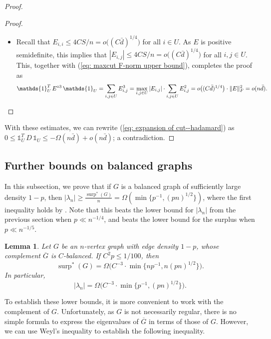 \documentclass[11pt]{article}
\theoremstyle{plain}
\newtheorem{lemma}[theorem]{Lemma}
\theoremstyle{definition}
\DeclareMathOperator{\surp}{surp}
\begin{document}
\begin{proof}
\begin{proof}
\begin{itemize}
        \item[(3)]  Recall that $E_{i,i} \le 4CS/n=o\big((C\bar{d})^{1/4}\big)$ for all $i \in U$. As $E$ is positive semidefinite, this implies that $|E_{i,j}|\leq 4CS/n =o\big((C\bar{d})^{1/4}\big)$ for all $i,j \in U$.
        This, together with (\ref{eq: maxcut F-norm upper bound}), completes the proof as 
        \[
            \mathds{1}_U^T\,E^{\circ 3}\,\mathds{1}_U
            = \sum_{i,j \in U} E_{i,j}^3
            = \max_{i,j\in U} |E_{i,j}|\cdot \sum_{i,j \in U} E_{i,j}^2
            = o\big((C\bar{d})^{1/4}\big)\cdot \|E\|_F^2
            = o(n\bar{d}).
            \hfill\qedhere
        \]
        \end{itemize}
    \end{proof}

     With these estimates, we can rewrite  (\ref{eq: expansion of cut--hadamard}) as $0 \le \mathds{1}^T_U\,D\,\mathds{1}_U \le -\Omega(n\bar{d})+o(n\bar{d})$; a contradiction.
\end{proof}


\subsection{Further bounds on balanced graphs}\label{subsec: unified bounds via eigenvalues}

In this subsection, we prove that if $G$ is a balanced graph of sufficiently large density $1-p$, then  $|\lambda_n|\geq \frac{\surp^*(G)}{n}=\Omega(\min\{p^{-1},(pn)^{1/2}\})$, where the first inequality holds by . Note that this beats the lower bound for $|\lambda_n|$ from the previous section when $p\ll n^{-1/4}$, and beats the lower bound for the surplus when $p\ll n^{-1/5}$.  

\begin{lemma}\label{lemma:dens4_main_balanced}
    Let $G$ be an $n$-vertex graph with edge density $1-p$, whose complement $\overline{G}$ is $C$-balanced. 
    If $C^2p \le 1/100$, then 
    $$\surp^*(G)= \Omega\Big(C^{-3}\cdot \min\{np^{-1},n(pn)^{1/2}\}\Big).$$
    In particular,
    $$|\lambda_n|=\Omega\Big(C^{-3}\cdot\min\{p^{-1},(pn)^{1/2}\}\Big).$$
\end{lemma}

To establish these lower bounds, it is more convenient to work with the complement of $G$. 
Unfortunately, as $G$ is not necessarily regular, there is no simple formula to express the eigenvalues of $\overline{G}$ in terms of those of $G$. 
However, we can use Weyl's inequality to establish the following inequality.
\end{document}
